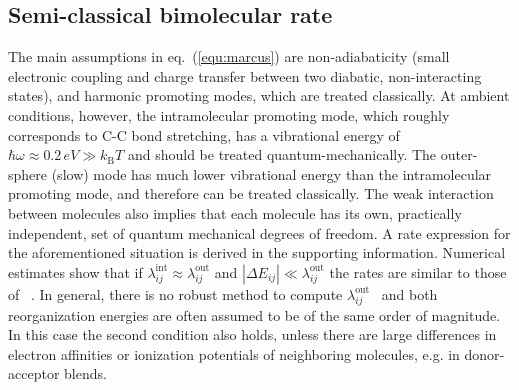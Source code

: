 \subsection{Semi-classical bimolecular rate}
The main assumptions in eq.~(\ref{equ:marcus}) are non-adiabaticity (small electronic coupling and  charge transfer between two diabatic, non-interacting states), and harmonic promoting modes, which are treated classically. At ambient conditions, however, the intramolecular promoting mode, which roughly corresponds to C-C bond stretching, has a vibrational energy of $\hbar\omega \approx 0.2\, \unit{eV} \gg k_\text{B}T$ and should be treated quantum-mechanically. The outer-sphere (slow) mode has much lower vibrational energy than the intramolecular promoting mode, and therefore can be treated classically. The weak interaction between molecules also implies that each molecule has its own, practically independent, set of quantum mechanical degrees of freedom.
A rate expression for the aforementioned situation is derived in the supporting information. Numerical estimates show that if  $\lambda_{ij}^\text{int} \approx \lambda_{ij}^\text{out}$ and $|\Delta E_{ij}| \ll \lambda_{ij}^\text{out}$ the rates are similar to those of ~. In general, there is no robust method to compute $\lambda_{ij}^\text{out}$~\cite{hoffman_reorganization_1996} and  both reorganization energies are often assumed to be of the same order of magnitude. In this case the second condition also holds, unless there are large differences in electron affinities or ionization potentials of neighboring molecules, e.g. in donor-acceptor blends.